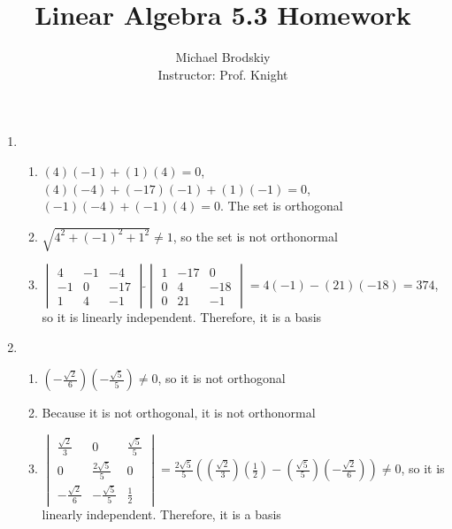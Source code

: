 \documentclass[12pt]{article}
\title{Linear Algebra 5.3 Homework}
\date{}
\author{Michael Brodskiy\\ \small Instructor: Prof. Knight}
\begin{document}
\maketitle

\begin{enumerate}

    \begin{center}
      \underline{5, 7, 11, 15, 17, 19, 43, 48, 56, 61, 64}
    \end{center}

    \setcounter{enumi}{4}

  \item 

    \begin{enumerate}

      \item $(4)(-1)+(1)(4)=0$, $(4)(-4)+(-17)(-1)+(1)(-1)=0$, $(-1)(-4)+(-1)(4)=0$. The set is orthogonal

      \item $\sqrt{4^2+(-1)^2+1^2}\neq 1$, so the set is not orthonormal

      \item $\begin{vmatrix} 4 & -1 & -4\\ -1 & 0 & -17\\ 1 & 4 & -1  \end{vmatrix}\widetilde{ }\begin{vmatrix} 1 & -17 & 0\\ 0 & 4 & -18\\ 0 & 21 & -1 \end{vmatrix}=4(-1)-(21)(-18)=374$, so it is linearly independent. Therefore, it is a basis

    \end{enumerate}

    \setcounter{enumi}{6}

  \item

    \begin{enumerate}

      \item $\left(-\frac{\sqrt{2}}{6}\right)\left(-\frac{\sqrt{5}}{5}\right)\neq 0$, so it is not orthogonal

      \item Because it is not orthogonal, it is not orthonormal

      \item $\begin{vmatrix} \frac{\sqrt{2}}{3} & 0 & \frac{\sqrt{5}}{5}\\ 0 & \frac{2\sqrt{5}}{5} & 0\\ -\frac{\sqrt{2}}{6} & -\frac{\sqrt{5}}{5} & \frac{1}{2}  \end{vmatrix}=\frac{2\sqrt{5}}{5}\left( \left(\frac{\sqrt{2}}{3}\right)\left( \frac{1}{2}  \right)-\left( \frac{\sqrt{5}}{5}\right)\left( -\frac{\sqrt{2}}{6} \right) \right)\neq0$, so it is linearly independent. Therefore, it is a basis


\end{enumerate}
\end{enumerate}
\end{document}
